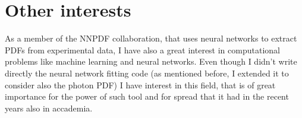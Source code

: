 \documentclass[11pt,a4paper]{moderncv}        %
\begin{document}
\section{Other interests}

As a member of the NNPDF collaboration, that uses neural networks to extract PDFs from experimental data, I have also a great interest
in computational problems like machine learning and neural networks.
Even though I didn't write directly the neural network fitting code (as mentioned before, I extended it to consider also the photon PDF)
I have interest in this field, that is of great importance for the power of such tool and for spread that it had in the recent years
also in accademia.

\newpage


\end{document}

